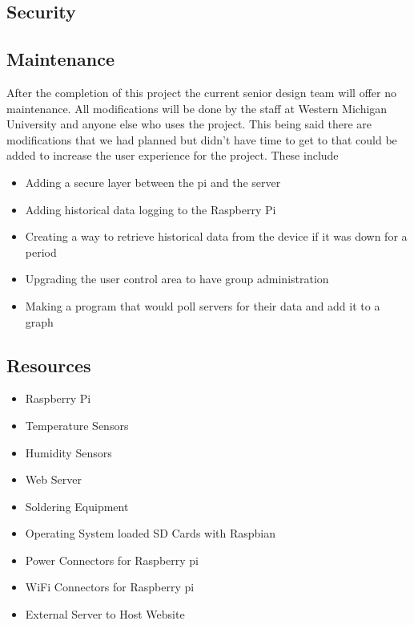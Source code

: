\documentclass{report}
\begin{document}
\newpage
\subsection*{Security}




\newpage
\subsection*{Maintenance}
After the completion of this project the current senior design team will offer no maintenance. All modifications will be done by the staff at Western Michigan University and anyone else who uses the project. This being said there are modifications that we had planned but didn't have time to get to that could be added to increase the user experience for the project. These include
\begin {itemize}
\item Adding a secure layer between the pi and the server
\item Adding historical data logging to the Raspberry Pi
\item Creating a way to retrieve historical data from the device if it was down for a period
\item Upgrading the user control area to have group administration
\item Making a program that would poll servers for their data and add it to a graph
\end {itemize}
\newpage

\subsection*{Resources}

\begin{itemize}
\item Raspberry Pi
\item Temperature Sensors
\item Humidity Sensors
\item Web Server
\item Soldering Equipment
\item Operating System loaded SD Cards with Raspbian
\item Power Connectors for Raspberry pi
\item WiFi Connectors for Raspberry pi
\item External Server to Host Website
\end{itemize}
\newpage
\end{document}
